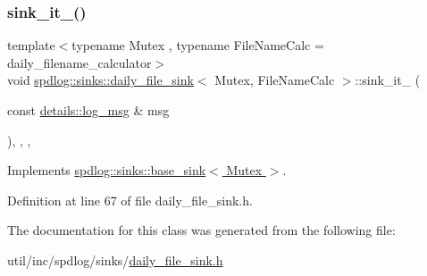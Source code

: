 \subsubsection{\texorpdfstring{sink\+\_\+it\+\_\+()}{sink\_it\_()}}
{\footnotesize\ttfamily template$<$typename Mutex , typename File\+Name\+Calc  = daily\+\_\+filename\+\_\+calculator$>$ \\
void \hyperlink{classspdlog_1_1sinks_1_1daily__file__sink}{spdlog\+::sinks\+::daily\+\_\+file\+\_\+sink}$<$ Mutex, File\+Name\+Calc $>$\+::sink\+\_\+it\+\_\+ (\begin{DoxyParamCaption}\item[{const \hyperlink{structspdlog_1_1details_1_1log__msg}{details\+::log\+\_\+msg} \&}]{msg }\end{DoxyParamCaption})\hspace{0.3cm}{\ttfamily [inline]}, {\ttfamily [override]}, {\ttfamily [protected]}, {\ttfamily [virtual]}}



Implements \hyperlink{classspdlog_1_1sinks_1_1base__sink_ad698d300cb7f5e58b2aa1b9907cdbd87}{spdlog\+::sinks\+::base\+\_\+sink$<$ Mutex $>$}.



Definition at line 67 of file daily\+\_\+file\+\_\+sink.\+h.



The documentation for this class was generated from the following file\+:\begin{DoxyCompactItemize}
\item 
util/inc/spdlog/sinks/\hyperlink{daily__file__sink_8h}{daily\+\_\+file\+\_\+sink.\+h}\end{DoxyCompactItemize}
